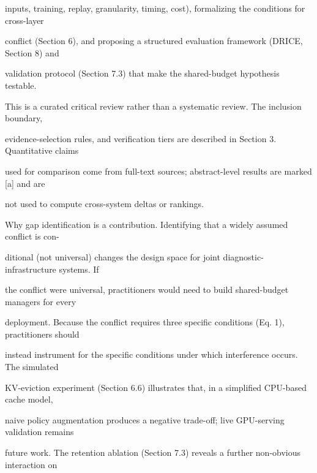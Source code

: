 \begin{flushleft}
\noindent inputs, training, replay, granularity, timing, cost), formalizing the conditions for cross-layer\par
\noindent conflict (Section 6), and proposing a structured evaluation framework (DRICE, Section 8) and\par
\noindent validation protocol (Section 7.3) that make the shared-budget hypothesis testable.\par
\noindent  This is a curated critical review rather than a systematic review. The inclusion boundary,\par
\noindent evidence-selection rules, and verification tiers are described in Section 3. Quantitative claims\par
\noindent used for comparison come from full-text sources; abstract-level results are marked [a] and are\par
\noindent not used to compute cross-system deltas or rankings.\par
\par\smallskip
\noindent Why gap identification is a contribution. Identifying that a widely assumed conflict is con-\par
\noindent ditional (not universal) changes the design space for joint diagnostic-infrastructure systems. If\par
\noindent the conflict were universal, practitioners would need to build shared-budget managers for every\par
\noindent deployment. Because the conflict requires three specific conditions (Eq. 1), practitioners should\par
\noindent instead instrument for the specific conditions under which interference occurs. The simulated\par
\noindent KV-eviction experiment (Section 6.6) illustrates that, in a simplified CPU-based cache model,\par
\noindent naive policy augmentation produces a negative trade-off; live GPU-serving validation remains\par
\noindent future work. The retention ablation (Section 7.3) reveals a further non-obvious interaction on\par
\end{flushleft}
